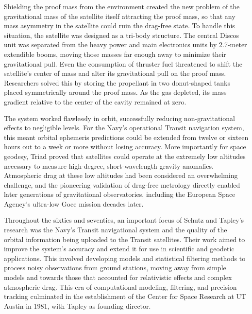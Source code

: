 Shielding the proof mass from the environment created the new problem of the gravitational mass of the satellite itself attracting the proof mass, so that any mass asymmetry in the satellite could ruin the drag-free state. To handle this situation, the satellite was designed as a tri-body structure. The central Discos unit was separated from the heavy power and main electronics units by 2.7-meter extendible booms, moving those masses far enough away to minimize their gravitational pull. Even the consumption of thruster fuel threatened to shift the satellite's center of mass and alter its gravitational pull on the proof mass. Researchers solved this by storing the propellant in two donut-shaped tanks placed symmetrically around the proof mass. As the gas depleted, its mass gradient relative to the center of the cavity remained at zero. 

The system worked flawlessly in orbit, successfully reducing non-gravitational effects to negligible levels. For the Navy's operational Transit navigation system, this meant orbital ephemeris predictions could be extended from twelve or sixteen hours out to a week or more without losing accuracy. More importantly for space geodesy, Triad proved that satellites could operate at the extremely low altitudes necessary to measure high-degree, short-wavelength gravity anomalies. Atmospheric drag at these low altitudes had been considered an overwhelming challenge, and the pioneering validation of drag-free metrology directly enabled later generations of gravitational observatories, including the European Space Agency's ultra-low Goce mission decades later. \cite{staffSatelliteFreedAll1974}

Throughout the sixties and seventies, an important focus of Schutz and Tapley’s research was the Navy’s Transit navigational system and the quality of the orbital information being uploaded to the Transit satellites. Their work aimed to improve the system's accuracy and extend it for use in scientific and geodetic applications. This involved developing models and statistical filtering methods to process noisy observations from ground stations, moving away from simple models and towards those that accounted for relativistic effects and complex atmospheric drag. This era of computational modeling, filtering, and precision tracking culminated in the establishment of the Center for Space Research at UT Austin in 1981, with Tapley as founding director. \cite{tapleyOrbitDeterminationPresence1973}

